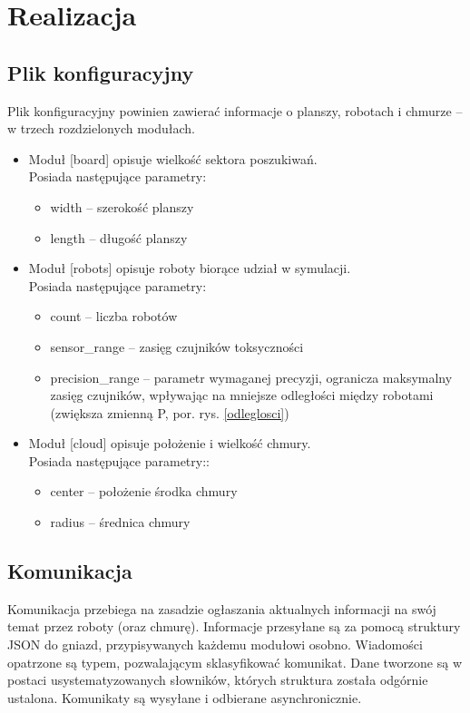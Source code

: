 \documentclass[a4paper, 12pt]{article}
\begin{document}
		
		
	
	
	
	\section{Realizacja}
	\subsection{Plik konfiguracyjny}
	Plik konfiguracyjny powinien zawierać informacje o planszy, robotach i chmurze -- w trzech rozdzielonych modułach.
	\begin{itemize}
	\item Moduł [board] opisuje wielkość sektora poszukiwań.\\
		Posiada następujące parametry:
	\begin{itemize}
	\item width -- szerokość planszy
	\item length -- długość planszy
	\end{itemize}
	\item Moduł [robots] opisuje roboty biorące udział w symulacji.\\
		Posiada następujące parametry:
	\begin{itemize}
	\item count -- liczba robotów
	\item sensor\_range -- zasięg czujników toksyczności
	\item precision\_range -- parametr wymaganej precyzji, ogranicza maksymalny zasięg czujników, wpływając na mniejsze odległości między robotami (zwiększa zmienną P, por. rys. \ref{odleglosci})
	\end{itemize}
	\item Moduł [cloud] opisuje położenie i wielkość chmury.\\
		Posiada następujące parametry::
	\begin{itemize}
	\item center -- położenie środka chmury
	\item radius -- średnica chmury
	\end{itemize}
	\end{itemize}
	
	\subsection{Komunikacja}
	Komunikacja przebiega na zasadzie ogłaszania aktualnych informacji na swój temat przez roboty (oraz chmurę). Informacje przesyłane są za pomocą struktury JSON do gniazd, przypisywanych każdemu modułowi osobno.
	Wiadomości opatrzone są typem, pozwalającym sklasyfikować komunikat. Dane tworzone są w postaci usystematyzowanych słowników, których struktura została odgórnie ustalona.
	Komunikaty są wysyłane i odbierane asynchronicznie.
\end{document}
